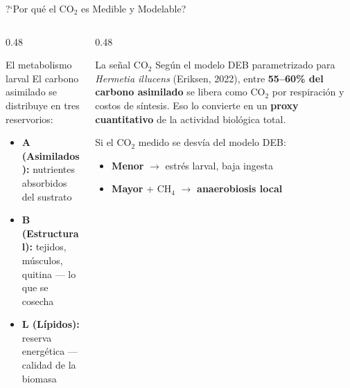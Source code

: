 \documentclass[aspectratio=169, 11pt]{beamer}
\newcommand{\BSF}{\textit{Hermetia illucens}}
\begin{document}
\begin{frame}{?`Por qu\'e el CO$_2$ es Medible y Modelable?}

\begin{columns}[T]

\begin{column}{0.48\textwidth}
\begin{block}{El metabolismo larval}
\footnotesize
El carbono asimilado se distribuye en tres reservorios:
\begin{itemize}
    \item \textbf{A (Asimilados):} nutrientes absorbidos del sustrato
    \item \textbf{B (Estructural):} tejidos, m\'usculos, quitina --- lo que se cosecha
    \item \textbf{L (L\'ipidos):} reserva energ\'etica --- calidad de la biomasa
\end{itemize}
\end{block}
\end{column}

\begin{column}{0.48\textwidth}
\begin{alertblock}{La se\~nal CO$_2$}
\footnotesize
Seg\'un el modelo DEB parametrizado para \BSF{} (Eriksen, 2022), entre \textbf{55--60\% del carbono asimilado} se libera como CO$_2$ por respiraci\'on y costos de s\'intesis. Eso lo convierte en un \textbf{proxy cuantitativo} de la actividad biol\'ogica total.

\vspace{0.2cm}
Si el CO$_2$ medido se desv\'ia del modelo DEB:
\begin{itemize}
    \item \textbf{Menor} $\rightarrow$ estr\'es larval, baja ingesta
    \item \textbf{Mayor} + CH$_4$ $\rightarrow$ \textbf{anaerobiosis local}
\end{itemize}
\end{alertblock}
\end{column}

\end{columns}

\end{frame}
\end{document}
